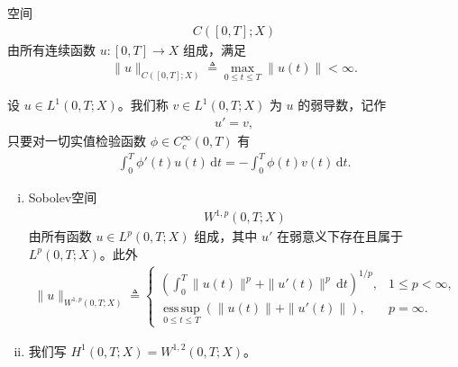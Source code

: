 \documentclass[../../main.tex]{subfiles}
\begin{document}
\begin{definition}\label{definition:ch05-C时间}
空间
\begin{align*}
C([0,T];X)
\end{align*}
由所有连续函数 $u:[0,T]\to X$ 组成，满足
\begin{align*}
\|u\|_{C([0,T];X)}\triangleq\max_{0\leqslant t\leqslant T}\|u(t)\|<\infty.
\end{align*}
\end{definition}

\begin{definition}\label{definition:ch05-时间弱导数}
设 $u\in L^{1}(0,T;X)$。我们称 $v\in L^{1}(0,T;X)$ 为 $u$ 的弱导数，记作
\begin{align*}
u'=v,
\end{align*}
只要对一切实值检验函数 $\phi\in C^{\infty}_{c}(0,T)$ 有
\begin{align*}
\int_{0}^{T}\phi'(t)u(t)\,\mathrm{d}t=-\int_{0}^{T}\phi(t)v(t)\,\mathrm{d}t.
\end{align*}
\end{definition}

\begin{definition}\label{definition:ch05-W1p时间}
\leavevmode
\begin{enumerate}[(i)]
\item Sobolev空间
\begin{align*}
W^{1,p}(0,T;X)
\end{align*}
由所有函数 $u\in L^{p}(0,T;X)$ 组成，其中 $u'$ 在弱意义下存在且属于 $L^{p}(0,T;X)$。此外
\begin{align*}
\|u\|_{W^{1,p}(0,T;X)}\triangleq
\begin{cases}
\left(\int_{0}^{T}\|u(t)\|^{p}+\|u'(t)\|^{p}\,\mathrm{d}t\right)^{1/p}, & 1\leqslant p<\infty,\\
\operatorname*{ess\,sup}_{0\leqslant t\leqslant T}(\|u(t)\|+\|u'(t)\|), & p=\infty.
\end{cases}
\end{align*}
\item 我们写 $H^{1}(0,T;X)=W^{1,2}(0,T;X)$。
\end{enumerate}
\end{definition}
\end{document}
